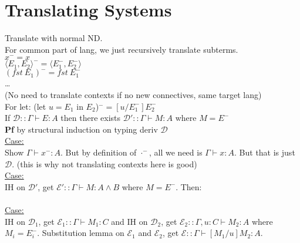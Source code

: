 \section{Translating Systems}
Translate  with normal ND.
\\ For common part of lang, we just recursively translate subterms.
\\ $x^- = x$
\\ $\langle E_1, E_2 \rangle^- = \langle E_1^-, E_2^- \rangle$
\\ $(fst\ E_1)^- = fst\ E_1^-$
\\ \ldots
\\ (No need to translate contexts if no new connectives, same target lang)
\\ For let: (let $u = E_1$ in $E_2$)$^-=[u/E_1^-]E_2^-$
\\ If $\mathcal{D} :: \Gamma \vdash E : A$ then there exists
$\mathcal{D}' :: \Gamma \vdash M : A$ where $M = E^-$
\\ \textbf{Pf} by structural induction on typing deriv $\mathcal{D}$
\\ \underline{Case:} 
\\ Show $\Gamma \vdash x^- : A$. But by definition of $\cdot^-$, all
we need is $\Gamma \vdash x :A$. But that is just $\mathcal{D}$. (this
is why not translating contexts here is good)
\\ \underline{Case:} 
\\ IH on $\mathcal{D}'$, get $\mathcal{E}' :: \Gamma \vdash M:A \land
B$ where $M = E^-$. Then:
\\ 
\\\underline{Case:}
\\ IH on $\mathcal{D}_1$, get $\mathcal{E}_1 :: \Gamma \vdash M_1 : C$
and IH on $\mathcal{D}_2$, get $\mathcal{E}_2 :: \Gamma, u : C \vdash
M_2 : A$ where $M_i = E_i^-$. Substitution lemma on $\mathcal{E}_1$
and $\mathcal{E}_2$, get $\mathcal{E} :: \Gamma \vdash [M_1/u]M_2 : A$.
\color{Magenta}
